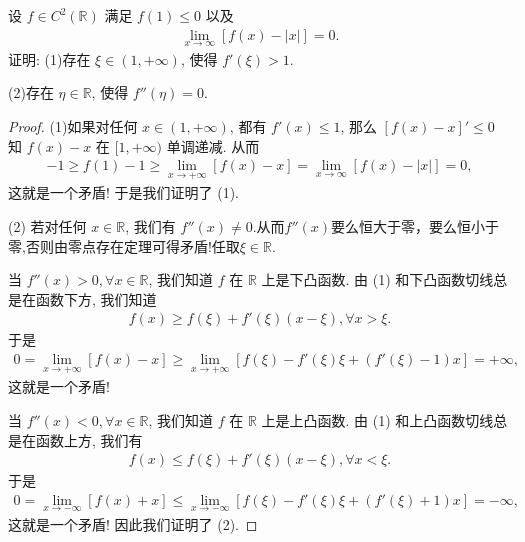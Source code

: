 \documentclass[../../main.tex]{subfiles}
\begin{document}
\begin{example}
设 $f\in C^2(\mathbb{R})$ 满足 $f(1)\leqslant0$ 以及
\begin{align*}
\lim_{x\to\infty}[f(x)-|x|]=0.
\tag{12.27}
\end{align*}
证明:
(1)存在 $\xi\in(1,+\infty)$, 使得 $f'(\xi)>1$.

(2)存在 $\eta\in\mathbb{R}$, 使得 $f''(\eta)=0$.
\end{example}
\begin{proof}
(1)如果对任何 $x\in(1,+\infty)$, 都有 $f'(x)\leqslant1$, 那么 $[f(x)-x]'\leqslant0$ 知 $f(x)-x$ 在 $[1,+\infty)$ 单调递减. 从而
\begin{align*}
-1\geqslant f(1)-1\geqslant\lim_{x\to+\infty}[f(x)-x]=\lim_{x\to\infty}[f(x)-|x|]=0,
\end{align*}
这就是一个矛盾! 于是我们证明了 (1).

(2)
若对任何 $x\in\mathbb{R}$, 我们有 $f''(x)\neq0$.从而$f''(x)$要么恒大于零，要么恒小于零,否则由零点存在定理可得矛盾!任取$\xi \in \mathbb{R}$.

当 $f''(x)>0,\forall x\in\mathbb{R}$, 我们知道 $f$ 在 $\mathbb{R}$ 上是下凸函数. 由 (1) 和下凸函数切线总是在函数下方, 我们知道
\begin{align*}
f(x)\geqslant f(\xi)+f'(\xi)(x-\xi),\forall x>\xi.
\end{align*}
于是
\begin{align*}
0=\lim_{x\to+\infty}[f(x)-x]\geqslant\lim_{x\to+\infty}[f(\xi)-f'(\xi)\xi+(f'(\xi)-1)x]=+\infty,
\end{align*}
这就是一个矛盾!

当 $f''(x)<0,\forall x\in\mathbb{R}$, 我们知道 $f$ 在 $\mathbb{R}$ 上是上凸函数. 由 (1) 和上凸函数切线总是在函数上方, 我们有
\begin{align*}
f(x)\leqslant f(\xi)+f'(\xi)(x-\xi),\forall x<\xi.
\end{align*}
于是
\begin{align*}
0=\lim_{x\to-\infty}[f(x)+x]\leqslant\lim_{x\to-\infty}[f(\xi)-f'(\xi)\xi+(f'(\xi)+1)x]=-\infty,
\end{align*}
这就是一个矛盾! 因此我们证明了 (2). 

\end{proof}
\end{document}
